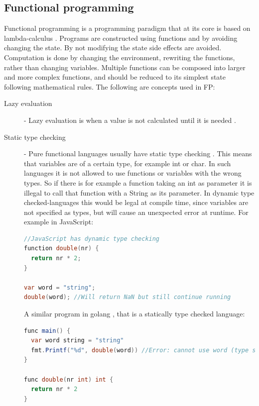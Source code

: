 \documentclass {article}
\begin{document}
\subsection{Functional programming}
Functional programming is a programming paradigm that at its core is based on lambda-calculus \cite{gabmar}. Programs are constructed using functions and by avoiding changing the state. By not modifying the state side effects are avoided. Computation is done by changing the environment, rewriting the functions, rather than changing variables. Multiple functions can be composed into larger and more complex functions, and should be reduced to its simplest state following mathematical rules. The following are concepts used in FP:
\begin{description}
\item [Lazy evaluation] - Lazy evaluation is when a value is not calculated until it is needed \cite{fogus}.
\item [Static type checking] - Pure functional languages usually have static type checking \cite{gabmar}. This means that variables are of a certain type, for example int or char. In such languages it is not allowed to use functions or variables with the wrong types. So if there is for example a function taking an int as parameter it is illegal to call that function with a String as its parameter. In dynamic type checked-languages this would be legal at compile time, since variables are not specified as types, but will cause an unexpected error at runtime. For example in JavaScript:

\begin{lstlisting}[language=Java]
//JavaScript has dynamic type checking
function double(nr) {
  return nr * 2;
}

var word = "string";
double(word); //Will return NaN but still continue running
\end{lstlisting}

\item [ ] A similar program in golang \cite{golang}, that is a statically type checked language:

\begin{lstlisting}[language=Java]
func main() {
  var word string = "string"
  fmt.Printf("%d", double(word)) //Error: cannot use word (type string) as type int in argument to double
}

func double(nr int) int {
  return nr * 2
}
\end{lstlisting}


\end{description}
\end{document}
